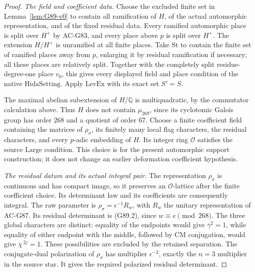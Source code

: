 \begin{proof}
\emph{The field and coefficient data.}
Choose the excluded finite set in Lemma~\ref{lem:G89-v0}
to contain all ramification of \(H\), of the actual automorphic
representation, and of the fixed residual data.
Every ramified automorphic place is split over \(H^+\)
by AC-G83, and every place above \(p\) is split over \(H^+\).
The extension \(H/H^+\) is unramified at all finite places.
Take \(\mathrm{St}\) to contain the finite set of ramified
places away from \(p\), enlarging it by residual ramification
if necessary; all these places are relatively split.
Together with the completely split residue-degree-one place \(v_0\),
this gives every displayed field and place condition of the
native \(\mathrm{HidaSetting}\).
Apply \(\mathrm{LevEx}\) with its exact set \(S'=S\).

The maximal abelian subextension of \(H/\mathbb Q\) is
multiquadratic, by the commutator calculation above.
Thus \(H\) does not contain \(\mu_{269}\), since its cyclotomic
Galois group has order \(268\) and a quotient of order \(67\).
Choose a finite coefficient field containing the matrices of
\(\rho_\sigma\), its finitely many local flag characters,
the residual characters, and every \(p\)-adic embedding of \(H\).
Its integer ring \(\mathcal O\) satisfies the source
\(\mathrm{Large}\) condition.
This choice is for the present automorphic support construction;
it does not change an earlier deformation coefficient hypothesis.

\emph{The residual datum and its actual integral pair.}
The representation \(\rho_\sigma\) is continuous and has compact
image, so it preserves an \(\mathcal O\)-lattice after the finite
coefficient choice.
Its determinant law and its coefficients are consequently integral.
The raw parameter is
\(\rho_\sigma=\epsilon^{-1}R_w\), with \(R_w\) the unitary
representation of AC-G87.
Its residual determinant is (G89.2), since
\(w\equiv e\pmod{268}\).
The three global characters are distinct: equality of the
endpoints would give \(\overline\gamma^2=1\), while equality
of either endpoint with the middle, followed by CM conjugation,
would give \(\overline\chi^{\,2j}=1\).
These possibilities are excluded by the retained separation.
The conjugate-dual polarization of \(\rho_\sigma\) has
multiplier \(\epsilon^{-2}\), exactly the \(n=3\) multiplier
in the source \(\mathrm{star}\).
It gives the required polarized residual determinant.


\end{proof}
